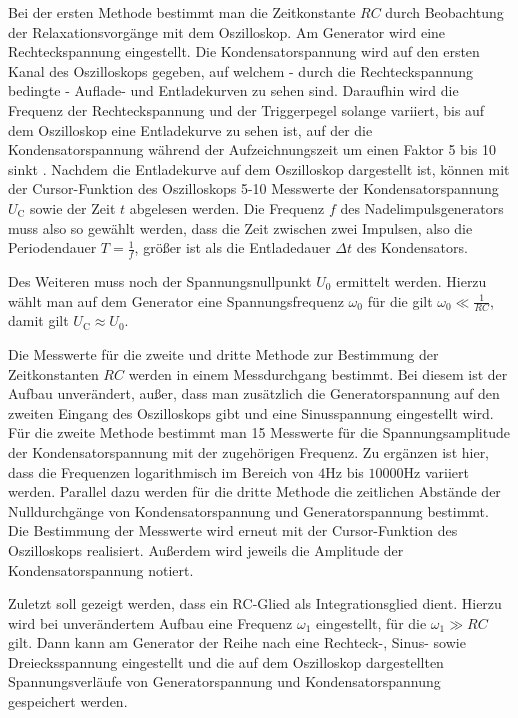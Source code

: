 Bei der ersten Methode bestimmt man die Zeitkonstante $RC$ durch Beobachtung der Relaxationsvorgänge mit dem Oszilloskop.
Am Generator wird eine Rechteckspannung eingestellt.
Die Kondensatorspannung wird auf den ersten Kanal des Oszilloskops gegeben, auf welchem - durch
die Rechteckspannung bedingte - Auflade- und Entladekurven zu sehen sind.
Daraufhin wird die Frequenz der Rechteckspannung und der Triggerpegel solange variiert, bis
auf dem Oszilloskop eine Entladekurve zu sehen ist, auf der die Kondensatorspannung während der
Aufzeichnungszeit um einen Faktor 5 bis 10 sinkt \cite{Anleitung}.
Nachdem die Entladekurve auf dem Oszilloskop dargestellt ist, können mit der Cursor-Funktion
des Oszilloskops 5-10 Messwerte der Kondensatorspannung $U_{\text{C}}$ sowie der Zeit $t$
abgelesen werden. Die Frequenz $f$ des Nadelimpulsgenerators muss also so gewählt werden, dass die Zeit zwischen zwei Impulsen, also die Periodendauer $T=\frac{1}{f}$, größer ist als die Entladedauer $\Delta t$ des Kondensators.


Des Weiteren muss noch der Spannungsnullpunkt $U_0$ ermittelt werden.
Hierzu wählt man auf dem Generator eine Spannungsfrequenz $\omega_0$ für die gilt
$\omega_0 \ll \frac{1}{RC}$, damit gilt $U_{\text{C}} \approx U_0$.


Die Messwerte für die zweite und dritte Methode zur Bestimmung der Zeitkonstanten $RC$ werden
in einem Messdurchgang bestimmt.
Bei diesem ist der Aufbau unverändert, außer, dass man zusätzlich die Generatorspannung auf den zweiten Eingang des Oszilloskops gibt und eine Sinusspannung eingestellt wird.
Für die zweite Methode bestimmt man 15 Messwerte für die Spannungsamplitude der Kondensatorspannung mit der zugehörigen Frequenz. Zu ergänzen ist hier, dass die Frequenzen logarithmisch im Bereich von $4 \si{\Hz}$ bis $10000 \si{\Hz}$ variiert werden.
Parallel dazu %
werden für die dritte Methode die zeitlichen Abstände der Nulldurchgänge von Kondensatorspannung und Generatorspannung bestimmt.
Die Bestimmung der Messwerte wird erneut mit der Cursor-Funktion des Oszilloskops realisiert.
Außerdem wird jeweils die Amplitude der Kondensatorspannung notiert.

Zuletzt soll gezeigt werden, dass ein RC-Glied als Integrationsglied dient.
Hierzu wird bei unverändertem Aufbau eine Frequenz $\omega_1$ eingestellt, für die $\omega_1 \gg RC$ gilt. Dann kann am Generator der Reihe nach eine Rechteck-, Sinus- sowie Dreiecksspannung eingestellt und die auf dem Oszilloskop dargestellten Spannungsverläufe von Generatorspannung und Kondensatorspannung gespeichert werden.
